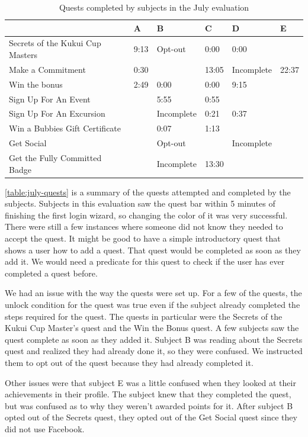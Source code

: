 \begin{table}[t]
	\begin{tabular}{| l || l | l | l | l | l |}
		\hline
		& A & B & C & D & E \\
		\hline
		Secrets of the Kukui Cup Masters & 9:13 & Opt-out & 0:00 & 0:00 & \\
    Make a Commitment & 0:30 & & 13:05 & Incomplete & 22:37 \\
    Win the \textdollar10 bonus & 2:49 & 0:00 & 0:00 & 9:15 & \\
    Sign Up For An Event & & 5:55 & 0:55 & & \\
    Sign Up For An Excursion & & Incomplete & 0:21 & 0:37 & \\
    Win a Bubbies Gift Certificate & & 0:07 & 1:13 & & \\
    Get Social & & Opt-out & & Incomplete & \\
    Get the Fully Committed Badge & & Incomplete & 13:30 & & \\
		\hline
	\end{tabular}
	\caption{Quests completed by subjects in the July evaluation}
	\label{table:july-quests}
\end{table}

\autoref{table:july-quests} is a summary of the quests attempted and completed by the subjects. Subjects in this evaluation saw the quest bar within 5 minutes of finishing the first login wizard, so changing the color of it was very successful. There were still a few instances where someone did not know they needed to accept the quest. It might be good to have a simple introductory quest that shows a user how to  add a quest. That quest would be completed as soon as they add it. We would need a predicate for this quest to check if the user has ever completed a quest before.

We had an issue with the way the quests were set up. For a few of the quests, the unlock condition for the quest was true even if the subject already completed the steps required for the quest. The quests in particular were the Secrets of the Kukui Cup Master's quest and the Win the  Bonus quest. A few subjects saw the quest complete as soon as they added it. Subject B was reading about the Secrets quest and realized they had already done it, so they were confused. We instructed them to opt out of the quest because they had already completed it.

Other issues were that subject E was a little confused when they looked at their achievements in their profile. The subject knew that they completed the quest, but was confused as to why they weren't awarded points for it. After subject B opted out of the Secrets quest, they opted out of the Get Social quest since they did not use Facebook.

